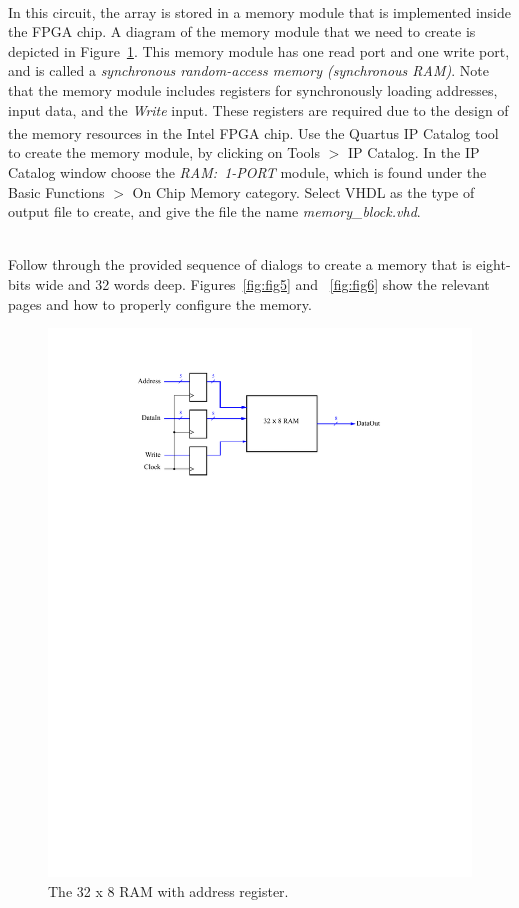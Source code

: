 \documentclass[epsfig,10pt,fullpage]{article}
\begin{document}
~\\
In this circuit, the array is stored in a memory module that is implemented inside the
FPGA chip. 
A diagram of the memory module that we need to create is depicted in Figure~\ref{fig:fig_RAM}.
This memory module has one read port and one write port, and is called a {\it synchronous 
random-access memory (synchronous RAM)}. Note that the memory module includes registers for 
synchronously loading addresses, input data, and the {\it Write} input. These registers
are required due to the design of the memory 
resources in the Intel\textsuperscript{\textregistered} FPGA chip. Use the Quartus\textsuperscript{\textregistered} IP Catalog tool to create the memory 
module, by clicking on 
{\sf Tools} $>$ {\sf IP Catalog}. In the IP Catalog window choose the {\it RAM:~1-PORT} module,
which is found under the {\sf Basic Functions $>$  On Chip Memory} category.  
Select {\sf VHDL} as the type of output file to create, and give the file the name 
{\it memory\_block.vhd}.

~\\
Follow through the provided sequence of dialogs to create a memory that is eight-bits wide
and 32 words deep. Figures~\ref{fig:fig5} and ~\ref{fig:fig6} show the 
relevant pages and how to properly configure the memory. 

\begin{figure}[H]
	\begin{center}
		\includegraphics[]{figures/figure_RAM.pdf}
	\end{center}
	\caption{The 32 {\sf x} 8 RAM with address register.}
	\label{fig:fig_RAM}
\end{figure}
\end{document}
